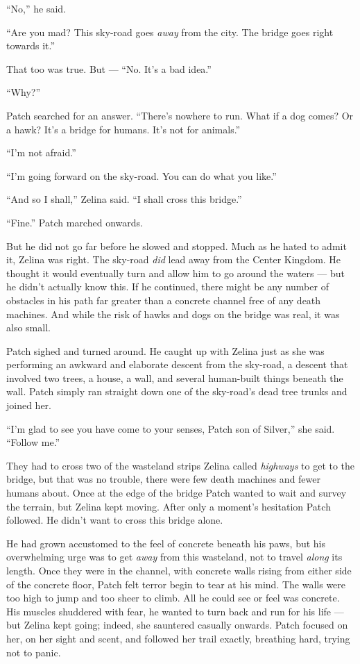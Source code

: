 \documentclass[12pt]{memoir}
\begin{document}
“No,” he said.

“Are you mad? This sky-road goes \textit{away} from the city. The
bridge goes right towards it.”

That too was true. But — “No. It’s a bad idea.”

“Why?”

Patch searched for an answer. “There’s nowhere to run. What if a dog
comes? Or a hawk? It’s a bridge for humans. It’s not for animals.”

“I’m not afraid.”

“I’m going forward on the sky-road. You can do what you like.”

“And so I shall,” Zelina said. “I shall cross this bridge.”

“Fine.” Patch marched onwards.

But he did not go far before he slowed and stopped. Much as he hated
to admit it, Zelina was right. The sky-road \textit{did} lead away
from the Center Kingdom. He thought it would eventually turn and allow
him to go around the waters — but he didn’t actually know this. If he
continued, there might be any number of obstacles in his path far
greater than a concrete channel free of any death machines. And while
the risk of hawks and dogs on the bridge was real, it was also small.

Patch sighed and turned around. He caught up with Zelina just as she
was performing an awkward and elaborate descent from the sky-road, a
descent that involved two trees, a house, a wall, and several
human-built things beneath the wall. Patch simply ran straight down
one of the sky-road’s dead tree trunks and joined her.

“I’m glad to see you have come to your senses, Patch son of Silver,”
she said. “Follow me.”

They had to cross two of the wasteland strips Zelina called
\textit{highways} to get to the bridge, but that was no trouble, there
were few death machines and fewer humans about. Once at the edge of
the bridge Patch wanted to wait and survey the terrain, but Zelina
kept moving. After only a moment’s hesitation Patch followed. He
didn’t want to cross this bridge alone.

He had grown accustomed to the feel of concrete beneath his paws, but
his overwhelming urge was to get \textit{away} from this wasteland,
not to travel \textit{along} its length. Once they were in the
channel, with concrete walls rising from either side of the concrete
floor, Patch felt terror begin to tear at his mind. The walls were too
high to jump and too sheer to climb. All he could see or feel was
concrete. His muscles shuddered with fear, he wanted to turn back and
run for his life — but Zelina kept going; indeed, she sauntered
casually onwards. Patch focused on her, on her sight and scent, and
followed her trail exactly, breathing hard, trying not to panic.
\end{document}

